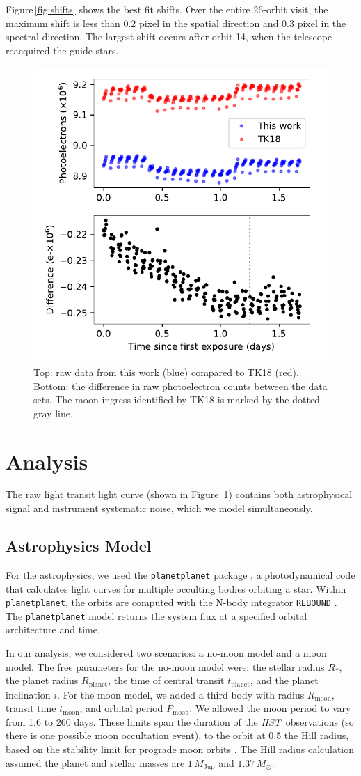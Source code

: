 \documentclass[twocolumn]{aastex62}
\newcommand{\project}[1]{\textsl{#1}}
\newcommand{\HST}{\project{HST}}
\begin{document}
Figure\,\ref{fig:shifts} shows the best fit shifts. Over the entire 26-orbit visit, the maximum shift is less than 0.2 pixel in the spatial direction and 0.3 pixel in the spectral direction. The largest shift occurs after orbit 14, when the telescope reacquired the guide stars. 

\begin{figure}
\includegraphics[width = 0.5 \textwidth]{figures/fig6_rawdata.pdf}
    \caption{Top: raw data from this work (blue) compared to TK18 (red). Bottom: the difference in raw photoelectron counts between the data sets. The moon ingress identified by TK18 is marked by the dotted gray line.}
\label{fig:raw}
\end{figure}

\section{Analysis}
The raw light transit light curve (shown in Figure~\ref{fig:raw}) contains both astrophysical signal and instrument systematic noise, which we model simultaneously. 

\subsection{Astrophysics Model}
For the astrophysics, we used the \texttt{planetplanet} package \citep{luger17}, a photodynamical code that calculates light curves for multiple occulting bodies orbiting a star. Within \texttt{planetplanet}, the orbits are computed with the N-body integrator \texttt{REBOUND} \citep{rein12}. The \texttt{planetplanet} model returns the system flux at a specified orbital architecture and time. 

In our analysis, we considered two scenarios: a no-moon model and a moon model. The free parameters for the no-moon model were: the stellar radius $R_*$, the planet radius $R_\mathrm{planet}$, the time of central transit $t_\mathrm{planet}$, and the planet inclination $i$. For the moon model, we added a third body with radius $R_\mathrm{moon}$, transit time $t_\mathrm{moon}$, and orbital period $P_\mathrm{moon}$. We allowed the moon period to vary from 1.6 to 260 days. These limits span the duration of the \HST\ observations (so there is one possible moon occultation event), to the orbit at 0.5 the Hill radius, based on the stability limit for prograde moon orbits \citep{domingos06}. The Hill radius calculation assumed the planet and stellar masses are $1\,M_\mathrm{Jup}$ and $1.37\,M_\odot$.
\end{document}
